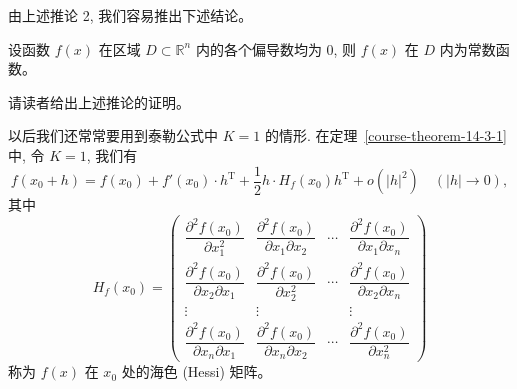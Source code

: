 \documentclass[12pt,fontset=fandol]{ctexart}
\begin{document}
由上述推论 2, 我们容易推出下述结论。

\noindent{}\quad 设函数 $f(x)$ 在区域 $D\subset\mathbb R^n$ 内的各个偏导数均为 0, 则 $f(x)$ 在 $D$ 内为常数函数。

请读者给出上述推论的证明。

以后我们还常常要用到泰勒公式中 $K=1$ 的情形. 在定理~\ref{course-theorem-14-3-1}  中, 令 $K=1$, 我们有
\[
  f(x_0+h)=f(x_0)+f'(x_0)\cdot h^\mathrm T
  +\frac12 h\cdot H_f(x_0)h^\mathrm T+o(|h|^2)
  \quad(|h|\to0),
\]
其中
\[
  H_f(x_0)=
  \begin{pmatrix}
    \dfrac{\partial^2 f(x_0)}{\partial x_1^2} &
    \dfrac{\partial^2 f(x_0)}{\partial x_1\partial x_2} &
    \cdots &
    \dfrac{\partial^2 f(x_0)}{\partial x_1\partial x_n}\\
    \dfrac{\partial^2 f(x_0)}{\partial x_2\partial x_1} &
    \dfrac{\partial^2 f(x_0)}{\partial x_2^2} &
    \cdots &
    \dfrac{\partial^2 f(x_0)}{\partial x_2\partial x_n}\\
    \vdots & \vdots & & \vdots\\
    \dfrac{\partial^2 f(x_0)}{\partial x_n\partial x_1} &
    \dfrac{\partial^2 f(x_0)}{\partial x_n\partial x_2} &
    \cdots &
    \dfrac{\partial^2 f(x_0)}{\partial x_n^2}
  \end{pmatrix}
\]
称为 $f(x)$ 在 $x_0$ 处的海色 (Hessi) 矩阵。
\end{document}
